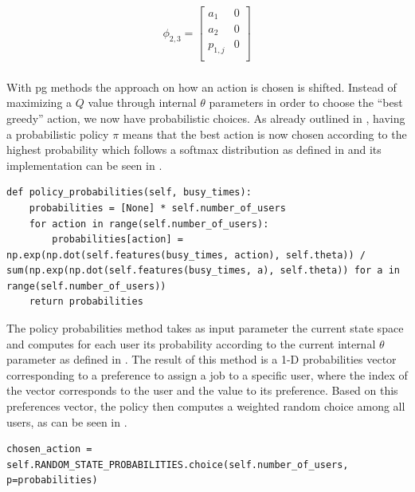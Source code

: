 \begin{equation}
\label{eq:kbatch_features_ex}
	\phi_{2,3} = 
	\begin{bmatrix}
	a_1 & 0 \\
	a_2 & 0 \\
	p_{1,j} & 0 \\
	\end{bmatrix}
\end{equation}

\subsubsection{}

With \gls{pg} methods the approach on how an action is chosen is shifted. Instead of maximizing a $Q$ value through internal $\theta$ parameters in order to choose the ``best greedy'' action, we now have probabilistic choices. As already outlined in , having a probabilistic policy $\pi$ means that the best action is now chosen according to the highest probability which follows a softmax distribution as defined in  and its implementation can be seen in .

\begin{lstlisting}[caption=Softmax distribution of preferences probabilities.,label=lst:softmax_probabilities,style=CustomPython]
def policy_probabilities(self, busy_times):
    probabilities = [None] * self.number_of_users
    for action in range(self.number_of_users):
        probabilities[action] = np.exp(np.dot(self.features(busy_times, action), self.theta)) / sum(np.exp(np.dot(self.features(busy_times, a), self.theta)) for a in range(self.number_of_users))
    return probabilities
\end{lstlisting}

The policy probabilities method takes as input parameter the current state space and computes for each user its probability according to the current internal $\theta$ parameter as defined in . The result of this method is a 1-D probabilities vector corresponding to a preference to assign a job to a specific user, where the index of the vector corresponds to the user and the value to its preference. Based on this preferences vector, the policy then computes a weighted random choice among all users, as can be seen in .

\begin{lstlisting}[caption=Probabilistic user choice by accounting for preferences weights.,label=lst:prob_user_choice,style=CustomPython]
chosen_action = self.RANDOM_STATE_PROBABILITIES.choice(self.number_of_users, p=probabilities)
\end{lstlisting}


